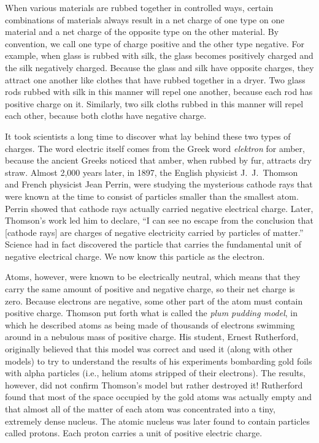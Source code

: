 \documentclass[main.tex]{subfiles}
\begin{document}
When various materials are rubbed together in controlled ways, certain combinations of materials always result in a net charge of one type on one material and a net charge of the opposite type on the other material. By convention, we call one type of charge positive and the other type negative. For example, when glass is rubbed with silk, the glass becomes positively charged and the silk negatively charged. Because the glass and silk have opposite charges, they attract one another like clothes that have rubbed together in a dryer. Two glass rods rubbed with silk in this manner will repel one another, because each rod has positive charge on it. Similarly, two silk cloths rubbed in this manner will repel each other, because both cloths have negative charge.

\vspace{1em}



It took scientists a long time to discover what lay behind these two types of charges. The word electric itself comes from the Greek word \textit{elektron} for amber, because the ancient Greeks noticed that amber, when rubbed by fur, attracts dry straw. Almost 2,000 years later, in 1897, the English physicist J.~J.~Thomson and French physicist Jean Perrin, were studying the mysterious cathode rays that were known at the time to consist of particles smaller than the smallest atom. Perrin showed that cathode rays actually carried negative electrical charge. Later, Thomson's work led him to declare, ``I can see no escape from the conclusion that [cathode rays] are charges of negative electricity carried by particles of matter.''
Science had in fact discovered the particle that carries the fundamental unit of negative electrical charge. We now know this particle as the \gls{electron}.
\vspace{1em}


Atoms, however, were known to be electrically neutral, which means that they carry the same amount of positive and negative charge, so their net charge is zero. Because electrons are negative, some other part of the atom must contain positive charge. Thomson put forth what is called the \textit{plum pudding model}, in which he described atoms as being made of thousands of electrons swimming around in a nebulous mass of positive charge. His student, Ernest Rutherford, originally believed that this model was correct and used it (along with other models) to try to understand the results of his experiments bombarding gold foils with alpha particles (i.e., helium atoms stripped of their electrons). The results, however, did not confirm Thomson's model but rather destroyed it! Rutherford found that most of the space occupied by the gold atoms was actually empty and that almost all of the matter of each atom was concentrated into a tiny, extremely dense nucleus. The atomic nucleus was later found to contain particles called protons.  Each \gls{proton} carries a unit of positive electric charge.
\end{document}
